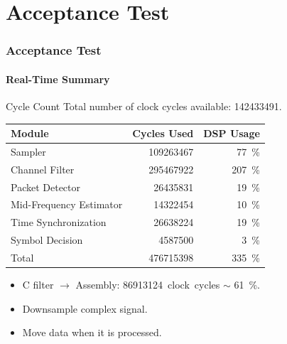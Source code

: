 \section{Acceptance Test} \label{sec:finaltest}
\begin{frame} \frametitle{Acceptance Test}
    \framesubtitle{Real-Time Summary}
    \begin{block}{Cycle Count}
        Total number of clock cycles available: \num{142433491}.
        \begin{center}
            \begin{tabular}{|l|r|r|} \hline
                \textbf{Module}         & \textbf{Cycles Used} & \textbf{DSP Usage} \\ \hline
                Sampler                 & \num{109263467}      & \SI{77}{\%}  \\
                Channel Filter          & \num{295467922}      & \SI{207}{\%} \\
                Packet Detector         & \num{ 26435831}      & \SI{19}{\%}  \\
                Mid-Frequency Estimator & \num{ 14322454}      & \SI{10}{\%}  \\
                Time Synchronization    & \num{ 26638224}      & \SI{19}{\%}  \\
                Symbol Decision         & \num{  4587500}      & \SI{3}{\%}  \\ \hline
                Total                   & \num{476715398}      & \SI{335}{\%} \\ \hline
            \end{tabular}
        \end{center}
        \begin{itemize}
        \item C filter $\rightarrow$ Assembly: \SI{86913124}{clock cycles} $\sim$ \SI{61}{\%}.
        \item Downsample complex signal.
        \item Move data when it is processed.
        \end{itemize}
    \end{block}
\end{frame}

